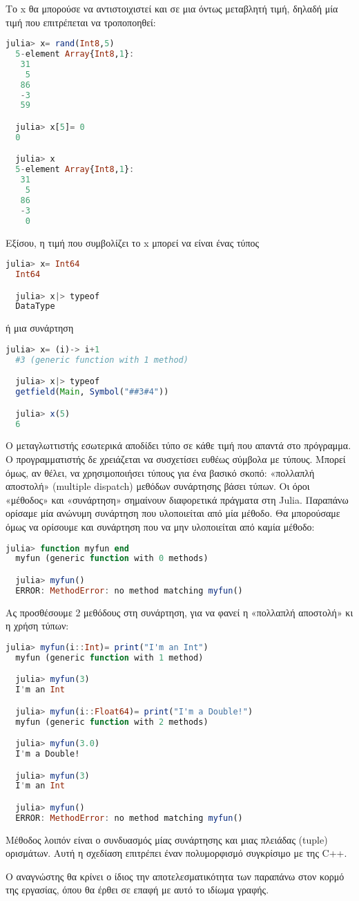   Το x θα μπορούσε να αντιστοιχιστεί και σε μια όντως μεταβλητή τιμή, δηλαδή μία τιμή που επιτρέπεται να τροποποηθεί:
  \begin{lstlisting}[language=julia]
  julia> x= rand(Int8,5)
  5-element Array{Int8,1}:
   31
    5
   86
   -3
   59

  julia> x[5]= 0
  0

  julia> x
  5-element Array{Int8,1}:
   31
    5
   86
   -3
    0
  \end{lstlisting}

  Εξίσου, η τιμή που συμβολίζει το x μπορεί να είναι ένας τύπος
  \begin{lstlisting}[language=julia]
  julia> x= Int64
  Int64

  julia> x|> typeof
  DataType
  \end{lstlisting}
  ή μια συνάρτηση
  \begin{lstlisting}[language=julia]
  julia> x= (i)-> i+1
  #3 (generic function with 1 method)

  julia> x|> typeof
  getfield(Main, Symbol("##3#4"))

  julia> x(5)
  6
  \end{lstlisting}

  Ο μεταγλωττιστής εσωτερικά αποδίδει τύπο σε κάθε τιμή που απαντά στο πρόγραμμα.
  Ο προγραμματιστής δε χρειάζεται να συσχετίσει ευθέως σύμβολα με τύπους.
  Μπορεί όμως, αν θέλει, να χρησιμοποιήσει τύπους για ένα βασικό σκοπό:
  «πολλαπλή αποστολή» (multiple dispatch) μεθόδων συνάρτησης βάσει τύπων.
  Οι όροι «μέθοδος» και «συνάρτηση» σημαίνουν διαφορετικά πράγματα στη Julia. Παραπάνω ορίσαμε μία ανώνυμη συνάρτηση που υλοποιείται από μία μέθοδο.
  Θα μπορούσαμε όμως να ορίσουμε και συνάρτηση που να μην υλοποιείται από καμία μέθοδο:
  \begin{lstlisting}[language=julia]
  julia> function myfun end
  myfun (generic function with 0 methods)

  julia> myfun()
  ERROR: MethodError: no method matching myfun()
  \end{lstlisting}

  Ας προσθέσουμε 2 μεθόδους στη συνάρτηση, για να φανεί η «πολλαπλή αποστολή» κι η χρήση τύπων:
  \begin{lstlisting}[language=julia]
  julia> myfun(i::Int)= print("I'm an Int")
  myfun (generic function with 1 method)

  julia> myfun(3)
  I'm an Int

  julia> myfun(i::Float64)= print("I'm a Double!")
  myfun (generic function with 2 methods)

  julia> myfun(3.0)
  I'm a Double!

  julia> myfun(3)
  I'm an Int

  julia> myfun()
  ERROR: MethodError: no method matching myfun()
  \end{lstlisting}

  Μέθοδος λοιπόν είναι ο συνδυασμός μίας συνάρτησης και μιας πλειάδας (tuple) ορισμάτων.
  Αυτή η σχεδίαση επιτρέπει έναν πολυμορφισμό συγκρίσιμο με της C++.

  Ο αναγνώστης θα κρίνει ο ίδιος την αποτελεσματικότητα των παραπάνω στον κορμό της εργασίας, όπου θα έρθει σε επαφή με αυτό το ιδίωμα γραφής.
